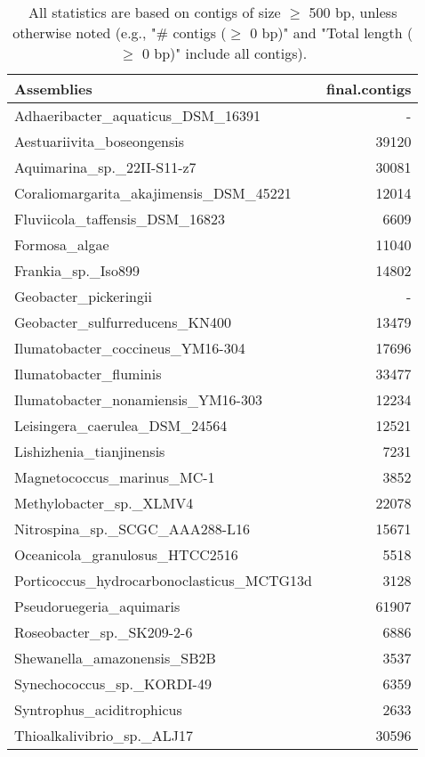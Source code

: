 \documentclass[12pt,a4paper]{article}
\begin{document}
\begin{table}[ht]
\begin{center}
\caption{All statistics are based on contigs of size $\geq$ 500 bp, unless otherwise noted (e.g., "\# contigs ($\geq$ 0 bp)" and "Total length ($\geq$ 0 bp)" include all contigs).}
\begin{tabular}{|l*{1}{|r}|}
\hline
Assemblies & final.contigs \\ \hline
Adhaeribacter\_aquaticus\_DSM\_16391 & - \\ \hline
Aestuariivita\_boseongensis & 39120 \\ \hline
Aquimarina\_sp.\_22II-S11-z7 & 30081 \\ \hline
Coraliomargarita\_akajimensis\_DSM\_45221 & 12014 \\ \hline
Fluviicola\_taffensis\_DSM\_16823 & 6609 \\ \hline
Formosa\_algae & 11040 \\ \hline
Frankia\_sp.\_Iso899 & 14802 \\ \hline
Geobacter\_pickeringii & - \\ \hline
Geobacter\_sulfurreducens\_KN400 & 13479 \\ \hline
Ilumatobacter\_coccineus\_YM16-304 & 17696 \\ \hline
Ilumatobacter\_fluminis & 33477 \\ \hline
Ilumatobacter\_nonamiensis\_YM16-303 & 12234 \\ \hline
Leisingera\_caerulea\_DSM\_24564 & 12521 \\ \hline
Lishizhenia\_tianjinensis & 7231 \\ \hline
Magnetococcus\_marinus\_MC-1 & 3852 \\ \hline
Methylobacter\_sp.\_XLMV4 & 22078 \\ \hline
Nitrospina\_sp.\_SCGC\_AAA288-L16 & 15671 \\ \hline
Oceanicola\_granulosus\_HTCC2516 & 5518 \\ \hline
Porticoccus\_hydrocarbonoclasticus\_MCTG13d & 3128 \\ \hline
Pseudoruegeria\_aquimaris & 61907 \\ \hline
Roseobacter\_sp.\_SK209-2-6 & 6886 \\ \hline
Shewanella\_amazonensis\_SB2B & 3537 \\ \hline
Synechococcus\_sp.\_KORDI-49 & 6359 \\ \hline
Syntrophus\_aciditrophicus & 2633 \\ \hline
Thioalkalivibrio\_sp.\_ALJ17 & 30596 \\ \hline

\end{tabular}
\end{center}
\end{table}
\end{document}
